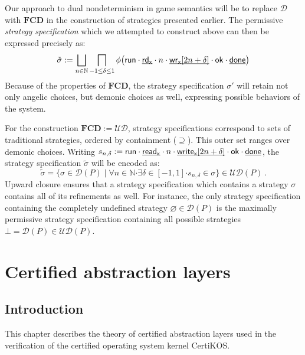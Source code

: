 \documentclass[11pt,oneside,draft]{book}
\theoremstyle{definition}
\newcommand{\kw}[1]{\ensuremath{ \mathsf{#1} }}
\newcommand{\bdot}{\boldsymbol{\cdot}}
\newcommand{\ul}[1]{%
  \underline{\smash{#1}}
}
\begin{document}
Our approach to dual nondeterminism in game semantics
will be to replace $\mathcal{D}$ with $\mathbf{FCD}$
in the construction of strategies presented earlier. 
The permissive \emph{strategy specification}
which we attempted to construct above
can then be expressed precisely as:
\[
  \tilde{\sigma} :=
    \bigsqcup_{n \in \mathbb{N}}
    \bigsqcap_{-1 \le \delta \le 1}
    \phi \big(
        \kw{run} \cdot
        \ul{\kw{rd}_\kw{x}} \cdot n \cdot
        \ul{\kw{wr}_\kw{x}[2n + \delta]} \cdot \kw{ok} \cdot
        \ul{\kw{done}} \big)
\]
Because of the properties of $\mathbf{FCD}$,
the strategy specification $\sigma'$ will retain
not only angelic choices,
but demonic choices as well,
expressing possible behaviors
of the system.

For the construction $\mathbf{FCD} := \mathcal{U} \mathcal{D}$,
strategy specifications correspond to
sets of traditional strategies,
ordered by containment ($\supseteq$).
This outer set ranges over demonic choices.
Writing
$
  s_{n,\delta} :=
        \kw{run} \cdot
        \ul{\kw{read}_\kw{x}} \cdot n \cdot
        \ul{\kw{write}_\kw{x}[2n + \delta]} \cdot \kw{ok} \cdot
        \ul{\kw{done}} %
$,
the strategy specification $\tilde{\sigma}$
will be encoded as:
\[
  \tilde{\sigma} =
  \{ \sigma \in \mathcal{D}(P) \mid
     \forall n \in \mathbb{N} \bdot
     \exists \delta \in [-1,1] \bdot
     s_{n,\delta} \in \sigma \}
  \in \mathcal{UD}(P)
  \,.
\]
Upward closure ensures that a strategy specification
which contains a strategy $\sigma$
contains all of its refinements as well.
For instance,
the only strategy specification
containing the completely undefined strategy
$\varnothing \in \mathcal{D}(P)$
is the maximally permissive strategy specification
containing all possible strategies
$\bot = \mathcal{D}(P) \in \mathcal{UD}(P)$.




\chapter{Certified abstraction layers} \label{sec:cal} %

\section{Introduction} %

This chapter describes
the theory of certified abstraction layers
used in the verification of
the certified operating system kernel CertiKOS.
\end{document}
